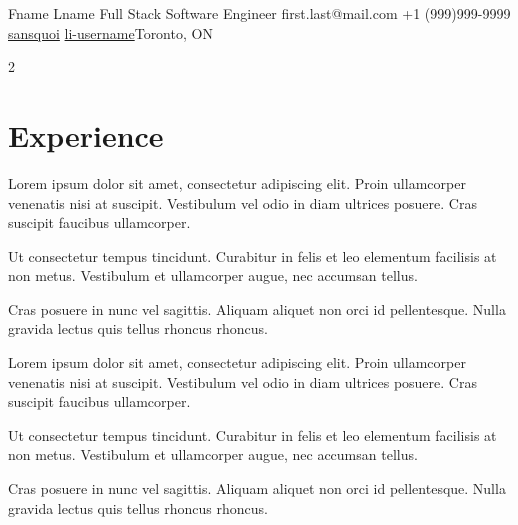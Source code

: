 \documentclass[]{plushcv}
\begin{document}
%
%
\header
  {Fname}
  {Lname}
  {Full Stack Software Engineer}
  {first.last@mail.com}
  {+1 (999)999-9999}
  {\href{https://www.github.com/sansquoi}{sansquoi}}
  {\href{https://www.linkedin.com/}{li-username}}{Toronto, ON}

%
%

\columnratio{\colratio}
\begin{paracol}{2}

\switchcolumn[0]


\section{Experience}
\begin{tightemize}
\item Lorem ipsum dolor sit amet, consectetur adipiscing elit. Proin ullamcorper venenatis nisi at suscipit. Vestibulum vel odio in diam ultrices posuere. Cras suscipit faucibus ullamcorper.
\item Ut consectetur tempus tincidunt. Curabitur in felis et leo elementum facilisis at non metus. Vestibulum et ullamcorper augue, nec accumsan tellus. \item Cras posuere in nunc vel sagittis. Aliquam aliquet non orci id pellentesque. Nulla gravida lectus quis tellus rhoncus rhoncus.  
\end{tightemize}
\sectionsep

\begin{tightemize}
\item Lorem ipsum dolor sit amet, consectetur adipiscing elit. Proin ullamcorper venenatis nisi at suscipit. Vestibulum vel odio in diam ultrices posuere. Cras suscipit faucibus ullamcorper.
\item Ut consectetur tempus tincidunt. Curabitur in felis et leo elementum facilisis at non metus. Vestibulum et ullamcorper augue, nec accumsan tellus.
\item Cras posuere in nunc vel sagittis. Aliquam aliquet non orci id pellentesque. Nulla gravida lectus quis tellus rhoncus rhoncus.
\end{tightemize}
\sectionsep


\end{paracol}
\end{document}
